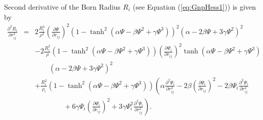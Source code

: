 \documentclass[12pt]{article}
\begin{document}
Second derivative of the Born Radius $R_{i}$ (see Equation (\ref{eq:GnpHess1})) is given by
\begin{eqnarray}
\frac{\partial^{2}R_{i}}{\partial r_{ij}^{2}} & = & 2\frac{R_{i}^{3}}{\rho^{2}}\left(\frac{\partial {\Psi}}{\partial r_{ij}}\right)^{2}(1 - \tanh^{2}({\alpha}{\Psi} - {\beta}{\Psi}^{2} + {\gamma}{\Psi}^{3}))^{2}({\alpha} - 2{\beta}{\Psi} + 3{\gamma}{\Psi}^{2})^{2}  \nonumber \\
& & - 2\frac{R_{i}^{2}}{\rho}(1 -{\tanh^{2}({\alpha}{\Psi} - {\beta}{\Psi}^{2} + {\gamma}{\Psi}^{3})}) \left(\frac{\partial {\Psi}_{i}}{\partial r_{ij}}\right)^{2} \tanh({\alpha}{\Psi} - {\beta}{\Psi}^{2} + {\gamma}{\Psi}^{3})  \nonumber \\
& &\qquad ({\alpha} - 2{\beta}{\Psi} + 3{\gamma}{\Psi}^{2})^{2}   \nonumber\\
& & +\frac{R_{i}^{2}}{{\rho}_{i}}(1 - \tanh^{2}({\alpha}{\Psi} - {\beta}{\Psi}^{2} + {\gamma}{\Psi}^{3}))\left({\alpha}\frac{\partial^{2}{\Psi}_{i}}{\partial r_{ij}^{2}} - 2{\beta}\left(\frac{\partial {\Psi}_{i}}{\partial r_{ij}}\right)^{2} - 2{\beta}{\Psi}_{i}\frac{\partial^{2}{\Psi}_{i}}{\partial r_{ij}^{2}}\right.  \nonumber \\
& & \qquad\qquad +\left. 6{\gamma}{\Psi}_{i}\left(\frac{\partial {\Psi}_{i}}{\partial r_{ij}}\right)^{2} + 3{\gamma}{\Psi}_{i}^{2}\frac{\partial^{2}{\Psi}_{i}}{\partial r_{ij}^{2}}\right).
\end{eqnarray}
\end{document}
